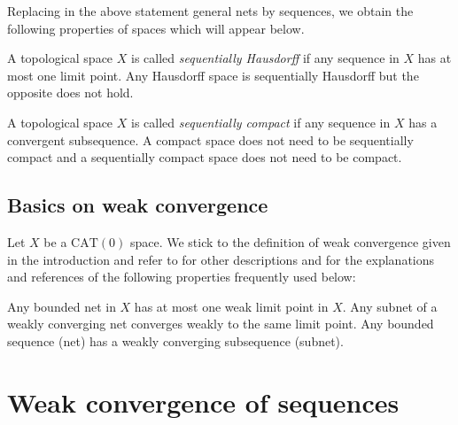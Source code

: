 \documentclass[12pt,leqno]{amsart}
\numberwithin{equation}{section}
\theoremstyle{remark}
\newcommand{\CAT}{\mathrm{CAT}}
\begin{document}
Replacing in the above statement general nets by sequences, we obtain the following properties of spaces which will appear below.

A topological space $X$ is called \emph{sequentially Hausdorff} if
any sequence in $X$ has at most one limit point. Any Hausdorff space is sequentially Hausdorff but the opposite does not hold.

A topological space $X$ is called \emph{sequentially compact} if any sequence in $X$ has a convergent subsequence. A compact space does not need to be sequentially compact and a sequentially compact space does not need to be compact.

\subsection{Basics on weak convergence}
Let $X$ be a $\CAT(0)$ space.
We stick to the definition of weak convergence given in the introduction and refer to \cite{Bac} for other descriptions and for the explanations and references of the following properties frequently used below:

Any bounded net in $X$ has at most one weak limit point in $X$.
Any subnet of a weakly converging net converges weakly to the same limit point. 
Any bounded sequence (net) has a weakly converging subsequence (subnet).
 

\section{Weak convergence of sequences} \label{sec: seq}
\end{document}
